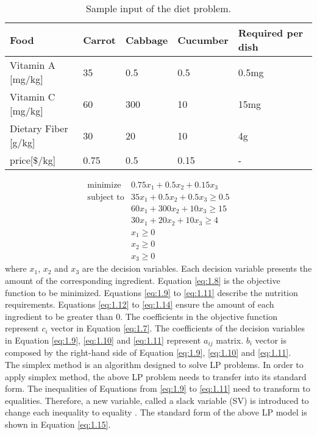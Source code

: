 \begin{table} 
\begin{center}
\begin{tabular}{| l | l  l  l | l |}
\hline
Food & Carrot & Cabbage & Cucumber & Required per dish \\ \hline
Vitamin A [mg/kg] & 35 & 0.5 & 0.5 & 0.5mg \\ 
Vitamin C [mg/kg] & 60 & 300 & 10 & 15mg \\ 
Dietary Fiber [g/kg] & 30 & 20 & 10 & 4g \\ \hline
price[$\$$/kg] & 0.75 & 0.5 & 0.15 & - \\ \hline
\end{tabular} 
\end{center}
\caption{Sample input of the diet problem.}
\label{tab:1.1}
\end{table}	

\begin{eqnarray} 
\text{minimize} & 0.75x_{1} + 0.5x_{2} +  0.15x_{3}  \label{eq:1.8} \\
\text{subject to} & 35x_{1} + 0.5x_{2} + 0.5x_{3} \geq 0.5 \label{eq:1.9} \\
& 60x_{1} + 300x_{2} + 10x_{3} \geq 15 \label{eq:1.10} \\
& 30x_{1} + 20x_{2} + 10x_{3} \geq 4 \label{eq:1.11} \\
& x_{1} \geq 0  \label{eq:1.12} \\
& x_{2} \geq 0  \label{eq:1.13} \\
& x_{3} \geq 0  \label{eq:1.14}
\end{eqnarray} 
where $x_{1}$, $x_{2}$ and $x_{3}$ are the decision variables. Each decision variable presents the amount of the corresponding ingredient. Equation \ref{eq:1.8} is the objective function to be minimized. Equations \ref{eq:1.9} to  \ref{eq:1.11} describe the nutrition requirements. Equations \ref{eq:1.12} to \ref{eq:1.14} ensure the amount of each ingredient to be greater than 0. The coefficients in the objective function represent $c_{i}$ vector in Equation \ref{eq:1.7}. The coefficients of the decision variables in Equation \ref{eq:1.9}, \ref{eq:1.10} and \ref{eq:1.11} represent $a_{ij}$ matrix. $b_{i}$ vector is composed by the right-hand side of Equation \ref{eq:1.9}, \ref{eq:1.10} and \ref{eq:1.11}. \\

The simplex method is an algorithm designed to solve LP problems. In order to apply simplex method, the above LP problem needs to transfer into its standard form. The inequalities of Equations from \ref{eq:1.9} to \ref{eq:1.11} need to transform to equalities. Therefore, a new variable, called a slack variable (SV) is introduced to change each inequality to equality \cite{ConvexOptimization}. The standard form of the above LP model is shown in Equation \ref{eq:1.15}. 


